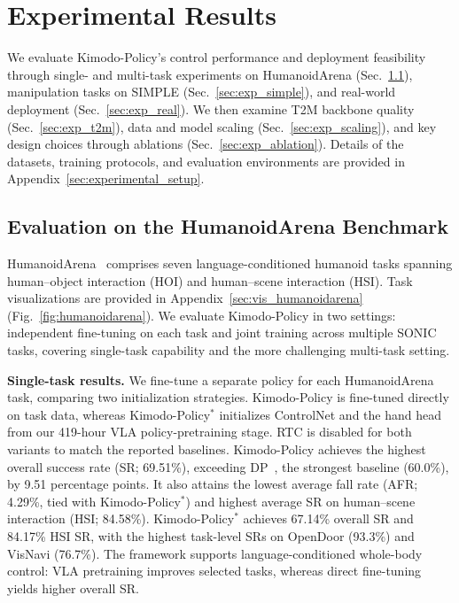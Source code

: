 \section{Experimental Results}
\label{sec:experiments}

We evaluate Kimodo-Policy's control performance and deployment feasibility through single- and multi-task experiments on HumanoidArena (Sec.~\ref{sec:exp_simulation}), manipulation tasks on SIMPLE (Sec.~\ref{sec:exp_simple}), and real-world deployment (Sec.~\ref{sec:exp_real}). We then examine T2M backbone quality (Sec.~\ref{sec:exp_t2m}), data and model scaling (Sec.~\ref{sec:exp_scaling}), and key design choices through ablations (Sec.~\ref{sec:exp_ablation}). Details of the datasets, training protocols, and evaluation environments are provided in Appendix~\ref{sec:experimental_setup}.

\subsection{Evaluation on the HumanoidArena Benchmark}
\label{sec:exp_simulation}

HumanoidArena~\cite{humanoidarena} comprises seven language-conditioned humanoid tasks spanning human--object interaction (HOI) and human--scene interaction (HSI). Task visualizations are provided in Appendix~\ref{sec:vis_humanoidarena} (Fig.~\ref{fig:humanoidarena}). We evaluate Kimodo-Policy in two settings: independent fine-tuning on each task and joint training across multiple SONIC tasks, covering single-task capability and the more challenging multi-task setting.



\textbf{Single-task results.} We fine-tune a separate policy for each HumanoidArena task, comparing two initialization strategies. Kimodo-Policy is fine-tuned directly on task data, whereas Kimodo-Policy$^{*}$ initializes ControlNet and the hand head from our 419-hour VLA policy-pretraining stage. RTC is disabled for both variants to match the reported baselines. Kimodo-Policy achieves the highest overall success rate (SR; 69.51\%), exceeding DP~\cite{chi2023diffusionpolicy}, the strongest baseline (60.0\%), by 9.51 percentage points. It also attains the lowest average fall rate (AFR; 4.29\%, tied with Kimodo-Policy$^{*}$) and highest average SR on human--scene interaction (HSI; 84.58\%). Kimodo-Policy$^{*}$ achieves 67.14\% overall SR and 84.17\% HSI SR, with the highest task-level SRs on OpenDoor (93.3\%) and VisNavi (76.7\%). The framework supports language-conditioned whole-body control: VLA pretraining improves selected tasks, whereas direct fine-tuning yields higher overall SR.

